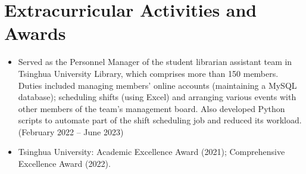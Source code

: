 \documentclass[letterpaper,11pt]{article}
\newcommand{\mySecondaryItem}[1]{
  \item\small{#1\vspace{-.5pt}}
}
\newcommand{\subHeadingListStart}{\begin{itemize}[leftmargin=*]}
\newcommand{\subHeadingListEnd}{\end{itemize}}
\begin{document}
\section{Extracurricular Activities and Awards}
\subHeadingListStart
	\mySecondaryItem{Served as the Personnel Manager of the student librarian assistant team in Tsinghua University Library, which comprises more than 150 members. Duties included managing members' online accounts (maintaining a MySQL database); scheduling shifts (using Excel) and arranging various events with other members of the team's management board. Also developed Python scripts to automate part of the shift scheduling job and reduced its workload. (February 2022 -- June 2023)}
	\mySecondaryItem{Tsinghua University: Academic Excellence Award (2021); Comprehensive Excellence Award (2022).}
\subHeadingListEnd


\end{document}
